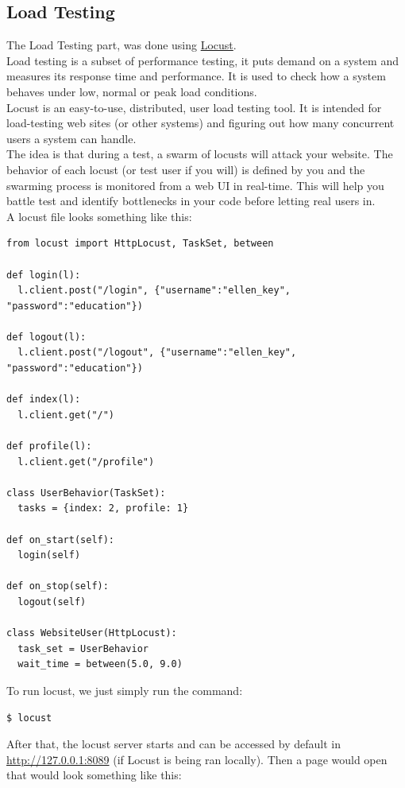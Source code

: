 \subsection{Load Testing}
The Load Testing part, was done using \href{https://locust.io/}{Locust}.\\
Load testing is a subset of performance testing, it puts demand on a system and measures its response time and performance. It is used to check how a system behaves under low, normal or peak load conditions.\\
Locust is an easy-to-use, distributed, user load testing tool. It is intended for load-testing web sites (or other systems) and figuring out how many concurrent users a system can handle.\\
The idea is that during a test, a swarm of locusts will attack your website. The behavior of each locust (or test user if you will) is defined by you and the swarming process is monitored from a web UI in real-time. This will help you battle test and identify bottlenecks in your code before letting real users in. \cite{WhatIsLocust}\\
\newline
A locust file looks something like this:
\begin{verbatim}
from locust import HttpLocust, TaskSet, between

def login(l):
  l.client.post("/login", {"username":"ellen_key", "password":"education"})

def logout(l):
  l.client.post("/logout", {"username":"ellen_key", "password":"education"})

def index(l):
  l.client.get("/")

def profile(l):
  l.client.get("/profile")

class UserBehavior(TaskSet):
  tasks = {index: 2, profile: 1}

def on_start(self):
  login(self)

def on_stop(self):
  logout(self)

class WebsiteUser(HttpLocust):
  task_set = UserBehavior
  wait_time = between(5.0, 9.0)
\end{verbatim}
To run locust, we just simply run the command:
\begin{verbatim}
$ locust
\end{verbatim}
After that, the locust server starts and can be accessed by default in \href{ http://127.0.0.1:8089}{http://127.0.0.1:8089} (if Locust is being ran locally). Then a page would open that would look something like this:
